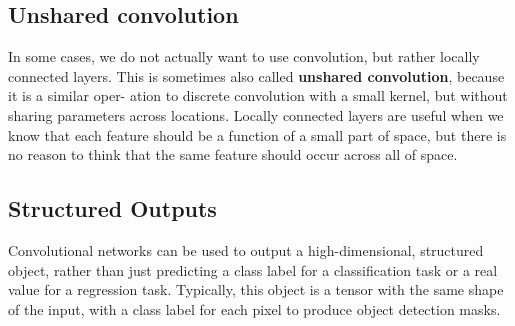 \subsection{Unshared convolution}
In some cases, we do not actually want to use convolution, but rather locally connected layers. This is sometimes also called \textbf{unshared convolution}, because it is a similar oper- ation to discrete convolution with a small kernel, but without sharing parameters across locations. Locally connected layers are useful when we know that each feature should be
a function of a small part of space, but there is no reason to think that the same feature should occur across all of space.

\subsection{Structured Outputs}
Convolutional networks can be used to output a high-dimensional, structured
object, rather than just predicting a class label for a classification task or a real value for a regression task. Typically, this object is a tensor with the same shape of the input, with a class label for each pixel to produce object detection masks.

